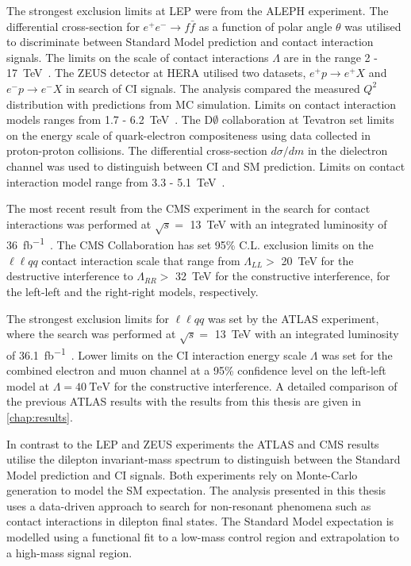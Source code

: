 The strongest exclusion limits at LEP were from the ALEPH experiment. The differential cross-section for $e^+e^- \rightarrow f\bar{f}$ as a function of polar angle $\theta$ was utilised to discriminate between Standard Model prediction and contact interaction signals. The limits on the scale of contact interactions $\Lambda$ are in the range 2 - \SI{17}{\tera\electronvolt}~\cite{Schael:2006wu}. The ZEUS detector at HERA utilised two datasets, $e^+p \rightarrow e^+X$ and $e^-p \rightarrow e^-X$ in search of CI signals. The analysis compared the measured $Q^2$ distribution with predictions from MC simulation. Limits on contact interaction models ranges from 1.7 - \SI{6.2}{\tera\electronvolt}~\cite{Chekanov:2003pw}. The $\mathrm{D}\emptyset$ collaboration at Tevatron set limits on the energy scale of quark-electron compositeness using data collected in proton-proton collisions. The differential cross-section $d\sigma/dm$ in the dielectron channel was used to distinguish between CI and SM prediction. Limits on contact interaction model range from 3.3 - \SI{5.1}{\tera\electronvolt}~\cite{Abbott:1998rr}. 

The most recent result from the CMS experiment in the search for contact interactions was performed at $\sqrt{s} = $ \SI{13}{\tera\electronvolt} with an integrated luminosity of \SI{36}{\femto\barn^{-1}}~\cite{Sirunyan:2018ipj}. The CMS Collaboration has set 95\% C.L. exclusion limits on the $\ell\ell qq$ contact interaction scale that range from $\Lambda_{LL} >$ \SI{20}{\tera\electronvolt} for the destructive interference to $\Lambda_{RR} >$ \SI{32}{\tera\electronvolt} for the constructive interference, for the left-left and the right-right models, respectively. 

The strongest exclusion limits for $\ell\ell qq$ was set by the ATLAS experiment, where the search was performed at $\sqrt{s} = $ \SI{13}{\tera\electronvolt} with an integrated luminosity of \SI{36.1}{\femto\barn^{-1}}~\cite{EXOT-2016-05}. Lower limits on the CI interaction energy scale $\Lambda$ was set for the combined electron and muon channel at a 95\% confidence level on the left-left model at $\Lambda = \SI{40}{\tera\electronvolt}$ for the constructive interference. A detailed comparison of the previous ATLAS results with the results from this thesis are given in \cref{chap:results}. 

In contrast to the LEP and ZEUS experiments the ATLAS and CMS results utilise the dilepton invariant-mass spectrum to distinguish between the Standard Model prediction and CI signals. Both experiments rely on Monte-Carlo generation to model the SM expectation. The analysis presented in this thesis uses a data-driven approach to search for non-resonant phenomena such as contact interactions in dilepton final states. The Standard Model expectation is modelled using a functional fit to a low-mass control region and extrapolation to a high-mass signal region. 


%
